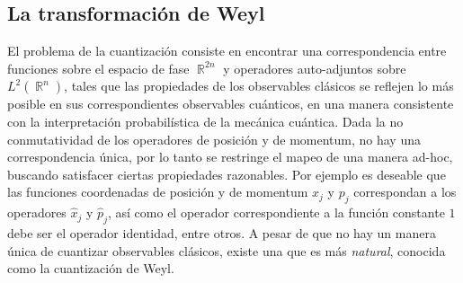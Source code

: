 \documentclass[a4paper]{report}
\DeclareMathOperator{\R}{\mathbb{R}}
\begin{document}
  \subsection{La transformación de Weyl}

  El problema de la cuantización consiste en encontrar una
  correspondencia entre funciones sobre el espacio de fase
  $\R^{2n}$ y operadores auto-adjuntos sobre $L^2(\R^{n})$,
  tales que las propiedades de los observables clásicos se
  reflejen lo más posible en sus correspondientes
  observables cuánticos, en una manera consistente con la
  interpretación probabilística de la mecánica cuántica.
  Dada la no conmutatividad de los operadores de posición y
  de momentum, no hay una correspondencia única, por lo
  tanto se restringe el mapeo de una manera ad-hoc, buscando
  satisfacer ciertas propiedades razonables. Por ejemplo es
  deseable que las funciones coordenadas de posición y de
  momentum $x_j$ y $p_j$ correspondan a los operadores
  $\hat{x}_j$ y $\hat{p}_j$, así como el operador
  correspondiente a la función constante $1$ debe ser el
  operador identidad, entre otros.  A pesar de que no hay un
  manera única de cuantizar observables clásicos, existe una
  que es más \textit{natural}, conocida como la cuantización
  de Weyl. 
\end{document}
